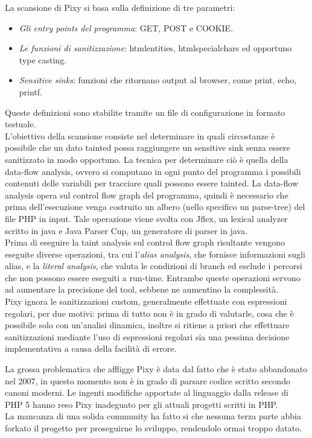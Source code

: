 La scansione di Pixy si basa sulla definizione di tre parametri:
\begin{itemize}
\item \emph{Gli entry points del programma}: GET, POST e COOKIE.
\item \emph{Le funzioni di sanitizzazione}: htmlentities, htmlspecialchars ed opportuno type casting.
\item \emph{Sensitive sinks}: funzioni che ritornano output al browser, come print, echo, printf.
\end{itemize}
Queste definizioni sono stabilite tramite un file di configurazione in formato testuale.\\
L'obiettivo della scansione consiste nel determinare in quali circostanze è possibile che un dato tainted possa raggiungere un sensitive sink senza essere sanitizzato in modo opportuno. La tecnica per determinare ciò è quella della data-flow analysis, ovvero si computano in ogni punto del programma i possibili contenuti delle variabili per tracciare quali possono essere tainted. La data-flow analysis opera sul control flow graph del programma, quindi è necessario che prima dell'esecuzione venga costruito un albero (nello specifico un parse-tree) del file PHP in input. Tale operazione viene svolta con Jflex\cite{jflex}, un lexical analyzer scritto in java e Java Parser Cup\cite{jpc}, un generatore di parser in java.\\
Prima di eseguire la taint analysis sul control flow graph risultante vengono eseguite diverse operazioni, tra cui l'\emph{alias analysis}, che fornisce informazioni sugli alias, e la \emph{literal analysis}, che valuta le condizioni di branch ed esclude i percorsi che non possono essere eseguiti a run-time. Entrambe queste operazioni servono ad aumentare la precisione del tool, sebbene ne aumentino la complessità.\\
Pixy ignora le sanitizzazioni custom, generalmente effettuate con espressioni regolari, per due motivi: prima di tutto non è in grado di valutarle, cosa che è possibile solo con un'analisi dinamica, inoltre si ritiene a priori che effettuare sanitizzazioni mediante l'uso di espressioni regolari sia una pessima decisione implementativa a causa della facilità di errore.

La grossa problematica che affligge Pixy è data dal fatto che è stato abbandonato nel 2007, in questo momento non è in grado di parsare codice scritto secondo canoni moderni. Le ingenti modifiche apportate al linguaggio dalla release di PHP 5 hanno reso Pixy inadeguato per gli attuali progetti scritti in PHP.\\
La mancanza di una solida community ha fatto si che nessuna terza parte abbia forkato il progetto per proseguirne lo sviluppo, rendendolo ormai troppo datato.

